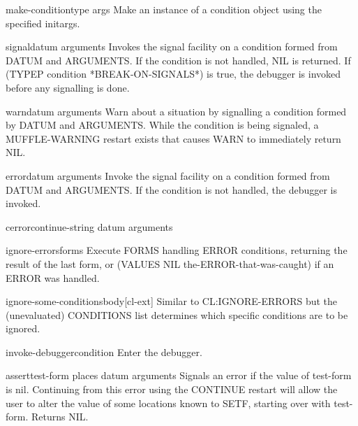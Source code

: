 \documentclass[10pt,english]{book}
\begin{document}
\begin{function}{make-condition}{type \rest args}
  Make an instance of a condition object using the specified initargs.
\end{function}

\begin{function}{signal}{datum \rest arguments}
  Invokes the signal facility on a condition formed from DATUM and
   ARGUMENTS. If the condition is not handled, NIL is returned. If
   (TYPEP condition *BREAK-ON-SIGNALS*) is true, the debugger is invoked
   before any signalling is done.
\end{function}

\begin{function}{warn}{datum \rest arguments}
  Warn about a situation by signalling a condition formed by DATUM and
   ARGUMENTS. While the condition is being signaled, a MUFFLE-WARNING restart
   exists that causes WARN to immediately return NIL.
\end{function}

\begin{function}{error}{datum \rest arguments}
  Invoke the signal facility on a condition formed from DATUM and ARGUMENTS.
  If the condition is not handled, the debugger is invoked.
\end{function}

\begin{function}{cerror}{continue-string datum \rest arguments}
  
\end{function}

\begin{macro}{ignore-errors}{\rest forms}
  Execute FORMS handling ERROR conditions, returning the result of the last
  form, or (VALUES NIL the-ERROR-that-was-caught) if an ERROR was handled.
\end{macro}

\begin{macro}{ignore-some-conditions}{\rest \body body}[cl-ext]
  Similar to CL:IGNORE-ERRORS but the (unevaluated) CONDITIONS
list determines which specific conditions are to be ignored.
\end{macro}

\begin{function}{invoke-debugger}{condition}
  Enter the debugger.
\end{function}

\begin{macro}{assert}{test-form \op places datum \rest arguments}
  Signals an error if the value of test-form is nil. Continuing from this
   error using the CONTINUE restart will allow the user to alter the value of
   some locations known to SETF, starting over with test-form. Returns NIL.
\end{macro}
\end{document}
